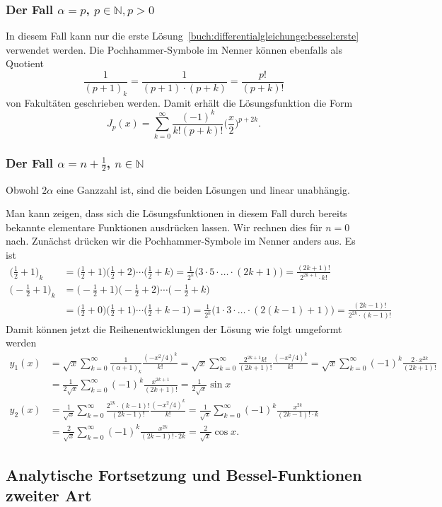 
\subsubsection{Der Fall $\alpha=p$, $p\in\mathbb{N}, p > 0$}
In diesem Fall kann nur die erste
Lösung~\eqref{buch:differentialgleichunge:bessel:erste}
verwendet werden.
Die Pochhammer-Symbole im Nenner können ebenfalls als
Quotient
\[
\frac{1}{(p+1)_k}
=
\frac{1}{(p+1)\cdot(p+k)}
=
\frac{p!}{(p+k)!}
\]
von Fakultäten geschrieben werden.
Damit erhält die Lösungsfunktion die Form
\[
J_p(x)
=
\sum_{k=0}^\infty
\frac{(-1)^k}{k!(p+k)!}\biggl(\frac{x}{2}\biggr)^{p+2k}.
\]

\subsubsection{Der Fall $\alpha=n+\frac12$, $n\in\mathbb{N}$}
Obwohl $2\alpha$ eine Ganzzahl ist, sind die beiden Lösungen
\label{buch:differentialgleichunge:bessel:erste}
und
\label{buch:differentialgleichunge:bessel:zweite}
linear unabhängig.

Man kann zeigen, dass sich die Lösungsfunktionen in diesem Fall
durch bereits bekannte elementare Funktionen ausdrücken lassen.
Wir rechnen dies für $n=0$ nach.
Zunächst drücken wir die Pochhammer-Symbole im Nenner anders aus.
Es ist
\begin{align*}
\biggl(\frac12 + 1\biggr)_k
&=
\biggl(\frac12 + 1\biggr)
\biggl(\frac12 + 2\biggr)
\cdots
\biggl(\frac12 + k\biggr)
=
\frac{1}{2^k}\bigl(3\cdot 5\cdot\ldots\cdot (2k+1)\bigr)
=
\frac{(2k+1)!}{2^{2k+1}\cdot k!}
\\
\biggl(-\frac12 + 1\biggr)_k
&=
\biggl(-\frac12 + 1\biggr)
\biggl(-\frac12 + 2\biggr)
\cdots
\biggl(-\frac12 + k\biggr)
\\
&=
\biggl(\frac12 + 0\biggr)
\biggl(\frac12 + 1\biggr)
\cdots
\biggl(\frac12 + k-1\biggr)
=
\frac{1}{2^k}\bigl(1\cdot 3 \cdot\ldots\cdot (2(k-1)+1)\bigr)
=
\frac{(2k-1)!}{2^{2k}\cdot (k-1)!}
\end{align*}
Damit können jetzt die Reihenentwicklungen der Lösung wie folgt
umgeformt werden
\begin{align*}
y_1(x)
&=
\sqrt{x}
\sum_{k=0}^\infty
\frac{1}{(\alpha+1)_k}
\frac{(-x^2/4)^k}{k!}
=
\sqrt{x}
\sum_{k=0}^\infty
\frac{2^{2k+1}k!}{(2k+1)!}
\frac{(-x^2/4)^k}{k!}
=
\sqrt{x}
\sum_{k=0}^\infty
(-1)^k
\frac{2\cdot x^{2k}}{(2k+1)!}
\\
&=
\frac{1}{2\sqrt{x}}
\sum_{k=0}^\infty
(-1)^k
\frac{x^{2k+1}}{(2k+1)!}
=
\frac{1}{2\sqrt{x}} \sin x
\\
y_2(x)
&=
\frac{1}{\sqrt{x}}
\sum_{k=0}^\infty
\frac{2^{2k}\cdot (k-1)!}{(2k-1)!}
\frac{(-x^2/4)^k}{k!}
=
\frac{1}{\sqrt{x}}
\sum_{k=0}^\infty
(-1)^k
\frac{x^{2k}}{(2k-1)!\cdot k}
\\
&=
\frac{2}{\sqrt{x}}
\sum_{k=0}^\infty
(-1)^k
\frac{x^{2k}}{(2k-1)!\cdot 2k}
=
\frac{2}{\sqrt{x}} \cos x.
\end{align*}


\subsection{Analytische Fortsetzung und Bessel-Funktionen zweiter Art}





